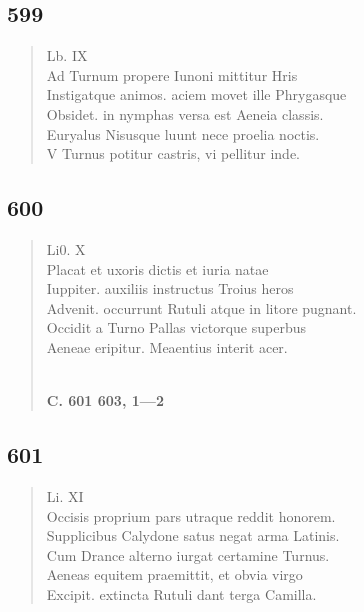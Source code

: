 \documentclass[11pt, a4paper]{report}
\begin{document}
            \subsection*{599}
      \begin{verse}
      Lb. IX \\ Ad Turnum propere Iunoni mittitur Hris \\ Instigatque animos. aciem movet ille Phrygasque \\ Obsidet. in nymphas versa est Aeneia classis. \\ Euryalus Nisusque luunt nece proelia noctis. \\ V Turnus potitur castris, vi pellitur inde. \\ 
      \end{verse}
  
            \subsection*{600}
      \begin{verse}
      Li0. X \\ Placat et uxoris dictis et iuria natae \\ Iuppiter. auxiliis instructus Troius heros \\ Advenit. occurrunt Rutuli atque in litore pugnant. \\ Occidit a Turno Pallas victorque superbus \\ Aeneae eripitur. Meaentius interit acer. \\ 
        ﻿\pagebreak 
    \begin{center} \textbf{C. 601 603, 1—2} \end{center} \marginpar{[86]} 
      \end{verse}
  
            \subsection*{601}
      \begin{verse}
      Li. XI \\ Occisis proprium pars utraque reddit honorem. \\ Supplicibus Calydone satus negat arma Latinis. \\ Cum Drance alterno iurgat certamine Turnus. \\ Aeneas equitem praemittit, et obvia virgo \\ Excipit. extincta Rutuli dant terga Camilla. \\ 
      \end{verse}
  
\end{document}
